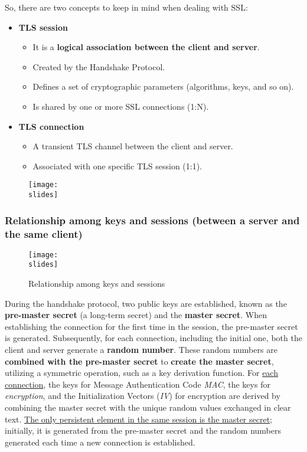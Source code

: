 So, there are two concepts to keep in mind when dealing with SSL:
\begin{itemize}
    \item \textbf{TLS session}
          \begin{itemize}
              \item It is a \textbf{logical association between the client and server}.
              \item Created by the Handshake Protocol.
              \item Defines a set of cryptographic parameters (algorithms, keys, and so on).
              \item Is shared by one or more SSL connections (1:N).
          \end{itemize}
    \item \textbf{TLS connection}
          \begin{itemize}
              \item A transient TLS channel between the client and server.
              \item Associated with one specific TLS session (1:1).
          \end{itemize}
\end{itemize}

\begin{figure}[h]
    \centering
    \texttt{[image: \\slides]}
\end{figure}


\subsubsection{Relationship among keys and sessions (between a server and the same client)}\label{chap:tls-session-keys}

\begin{figure}[h]
    \centering
    \texttt{[image: \\slides]}
    \caption{Relationship among keys and sessions}
    \label{fig:tls-session-keys}
\end{figure}

During the handshake protocol, two public keys are established, known as the \textbf{pre-master secret} (a long-term secret) and the \textbf{master secret}. When establishing the connection for the first time in the session, the pre-master secret is generated. Subsequently, for each connection, including the initial one, both the client and server generate a \textbf{random number}. These random numbers are \textbf{combined with the pre-master secret} to \textbf{create the master secret}, utilizing a symmetric operation, such as a key derivation function. For \underline{each connection}, the keys for Message Authentication Code \textit{MAC}, the keys for \textit{encryption}, and the Initialization Vectors (\textit{IV}) for encryption are derived by combining the master secret with the unique random values exchanged in clear text. \ul{The only persistent element in the same session is the master secret}; initially, it is generated from the pre-master secret and the random numbers generated each time a new connection is established.


